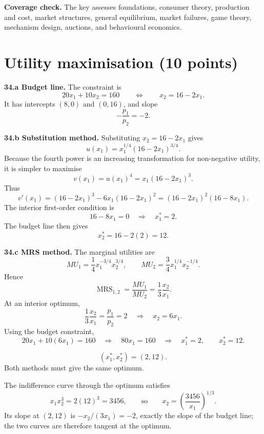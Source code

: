 \documentclass[11pt,a4paper]{article}
\newcommand{\MRS}{\operatorname{MRS}}
\begin{document}
\begin{tipbox}
\textbf{Coverage check.} The key assesses foundations, consumer theory,
production and cost, market structures, general equilibrium, market failures,
game theory, mechanism design, auctions, and behavioural economics.
\end{tipbox}

\section{Utility maximisation \hfill (10 points)}

\textbf{34.a Budget line.} The constraint is
\[
20x_1+10x_2=160
\qquad\Longleftrightarrow\qquad
\boxed{x_2=16-2x_1.}
\]
It has intercepts \((8,0)\) and \((0,16)\), and slope
\[
\boxed{-\frac{p_1}{p_2}=-2.}
\]

\textbf{34.b Substitution method.} Substituting \(x_2=16-2x_1\) gives
\[
u(x_1)=x_1^{1/4}(16-2x_1)^{3/4}.
\]
Because the fourth power is an increasing transformation for non-negative
utility, it is simpler to maximise
\[
v(x_1)=u(x_1)^4=x_1(16-2x_1)^3.
\]
Thus
\[
v'(x_1)
=(16-2x_1)^3-6x_1(16-2x_1)^2
=(16-2x_1)^2(16-8x_1).
\]
The interior first-order condition is
\[
16-8x_1=0
\quad\Longrightarrow\quad
x_1^*=2.
\]
The budget line then gives
\[
x_2^*=16-2(2)=12.
\]

\textbf{34.c MRS method.} The marginal utilities are
\[
MU_1=\frac14x_1^{-3/4}x_2^{3/4},
\qquad
MU_2=\frac34x_1^{1/4}x_2^{-1/4}.
\]
Hence
\[
\MRS_{1,2}=\frac{MU_1}{MU_2}
=\frac13\frac{x_2}{x_1}.
\]
At an interior optimum,
\[
\frac13\frac{x_2}{x_1}=\frac{p_1}{p_2}=2
\quad\Longrightarrow\quad
x_2=6x_1.
\]
Using the budget constraint,
\[
20x_1+10(6x_1)=160
\quad\Longrightarrow\quad
80x_1=160
\quad\Longrightarrow\quad
x_1^*=2,\qquad x_2^*=12.
\]

\begin{solutionbox}
\[
\boxed{(x_1^*,x_2^*)=(2,12).}
\]
Both methods must give the same optimum.
\end{solutionbox}

The indifference curve through the optimum satisfies
\[
x_1x_2^3=2(12)^3=3456,
\qquad\text{so}\qquad
x_2=\left(\frac{3456}{x_1}\right)^{1/3}.
\]
Its slope at \((2,12)\) is \(-x_2/(3x_1)=-2\), exactly the slope of the
budget line; the two curves are therefore tangent at the optimum.

\begin{center}
\end{center}
\end{document}
